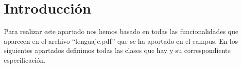 \section{Introducción}
Para realizar este apartado nos hemos basado en todas las funcionalidades que aparecen en el archivo ``lenguaje.pdf''
que se ha aportado en el campus. En los siguientes apartados definimos todas las clases que hay y su correspondiente especificación.